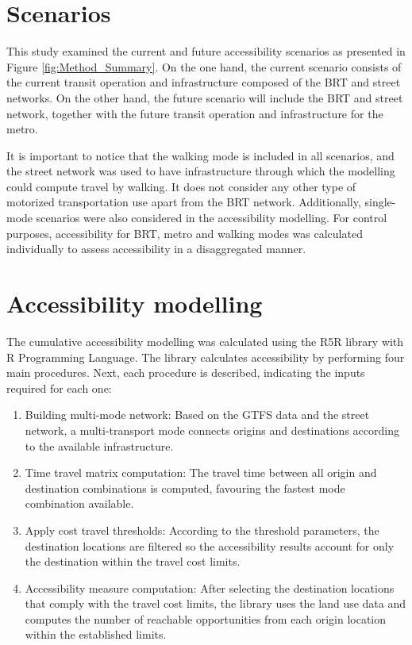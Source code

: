 \documentclass[12pt, a4paper]{report}
\begin{document}
\section{Scenarios} \label{Scenarios}

This study examined the current and future accessibility scenarios as presented in Figure \ref{fig:Method_Summary}. On the one hand, the current scenario consists of the current transit operation and infrastructure composed of the BRT and street networks. On the other hand, the future scenario will include the BRT and street network, together with the future transit operation and infrastructure for the metro.

It is important to notice that the walking mode is included in all scenarios, and the street network was used to have infrastructure through which the modelling could compute travel by walking. It does not consider any other type of motorized transportation use apart from the BRT network. Additionally, single-mode scenarios were also considered in the accessibility modelling. For control purposes, accessibility for BRT, metro and walking modes was calculated individually to assess accessibility in a disaggregated manner.

\section{Accessibility modelling}

The cumulative accessibility modelling was calculated using the R5R library \citep{pereiraR5rRapidRealistic2021} with R Programming Language. The library calculates accessibility by performing four main procedures. Next, each procedure is described, indicating the inputs required for each one:

\begin{enumerate}
    \item Building multi-mode network: Based on the GTFS data and the street network, a multi-transport mode connects origins and destinations according to the available infrastructure.
    \item Time travel matrix computation: The travel time between all origin and destination combinations is computed, favouring the fastest mode combination available.
    \item Apply cost travel thresholds: According to the threshold parameters, the destination locations are filtered so the accessibility results account for only the destination within the travel cost limits.
    \item Accessibility measure computation: After selecting the destination locations that comply with the travel cost limits, the library uses the land use data and computes the number of reachable opportunities from each origin location within the established limits. 
\end{enumerate}
\end{document}
